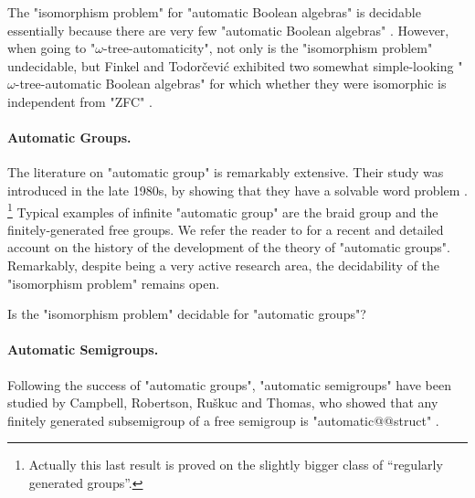 The "isomorphism problem" for "automatic Boolean algebras" is decidable
\cite[Corollary~3.5]{KhoussainovNiesRubinStephan2007Automatic} essentially
because there are very few "automatic Boolean algebras" \cite[Theorem~3.4]{KhoussainovNiesRubinStephan2007Automatic}.
However, when going to "$\omega$-tree-automaticity", not only is the "isomorphism problem"
undecidable, but Finkel and Todor\v{c}ević exhibited two somewhat simple-looking
"$\omega$-tree-automatic Boolean algebras" for which whether they were isomorphic
is independent from "ZFC" \cite[Theorem~6.1]{FinkelTodorcevic2010Isomorphism}.

\paragraph*{Automatic Groups.}
The literature on "automatic group" is remarkably extensive.
Their study was introduced in the late 1980s,
by showing that they have a solvable word problem \cite[Theorem~2.1.9]{Epstein1992Word}.%
\footnote{Actually this last result is proved on the slightly bigger class of ``regularly generated groups''.}
Typical examples of infinite "automatic group" are the braid group
\cite[Theorem~9.3.1]{Epstein1992Word} and the finitely-generated free groups.
We refer the reader to \cite{Rees2022AutomaticGroups} for a recent and detailed account on
the history of the development of the theory of "automatic groups".
Remarkably, despite being a very active research area, the decidability of
the "isomorphism problem" remains open.

\begin{openproblem}
	Is the "isomorphism problem" decidable for "automatic groups"?
\end{openproblem}

\paragraph*{Automatic Semigroups.}
Following the success of "automatic groups",
"automatic semigroups" have been studied by Campbell,
Robertson, Ru\v{s}kuc and Thomas, who showed
that any finitely generated subsemigroup of a free semigroup
is "automatic@@struct"
\cite[Theorem~8.1]{CampbellRobertsonRuskucThomas2001AutomaticSemigroups}.

